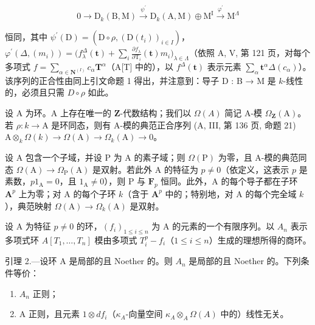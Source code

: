 \[
0 \to \mathrm{D} _ {k} (\mathrm{B}, \mathrm{M}) \xrightarrow {\psi^ {\prime}} \mathrm{D} _ {k} (\mathrm{A}, \mathrm{M}) \oplus \mathrm{M} ^ {\mathrm{I}} \xrightarrow {\varphi^ {\prime}} \mathrm{M} ^ {\Lambda}
\]

恒同，其中 \(\psi^{\prime}(\mathrm{D}) = (\mathrm{D}\circ \rho,(\mathrm{D}(t_{i}))_{i\in I})\)，\(\varphi^{\prime}(\Delta,(m_{i})) = \big(f_{\lambda}^{\Delta}(\mathbf{t}) + \sum_{i}\frac{\partial f_{\lambda}}{\partial\mathrm{T}_{i}}(\mathbf{t})m_{i}\big)_{\lambda \in \Lambda}\)（依照 A, V, 第 121 页，对每个多项式 \(f = \sum_{\alpha \in \mathbf{N}^{(I)}}c_{\alpha}\mathbf{T}^{\alpha}\)（A{[}T{]} 中的），以 \(f^{\Delta}(\mathbf{t})\) 表示元素 \(\sum_{\alpha}\mathbf{t}^{\alpha}\Delta(c_{\alpha})\)）。该序列的正合性由同上引文命题 1 得出，并注意到：导子 D : B → M 是 \(k\)-线性的，必须且只需 \(D\circ\rho\) 如此。

设 A 为环。A 上存在唯一的 \(\mathbf{Z}\)-代数结构；我们以 \(\Omega(A)\) 简记 A-模 \(\Omega_{\mathbf{Z}}(\mathrm{A})\)。若 \(\rho : k \to \mathrm{A}\) 是环同态，则有 A-模的典范正合序列 (A, III, 第 136 页, 命题 21) \(\mathrm{A} \otimes_k \Omega(k) \to \Omega(\mathrm{A}) \to \Omega_k(\mathrm{A}) \to 0\)。

设 A 包含一个子域，并设 P 为 A 的素子域；则 \(\Omega(\mathrm{P})\) 为零，且 A-模的典范同态 \(\Omega(\mathrm{A}) \to \Omega_{\mathrm{P}}(\mathrm{A})\) 是双射。若此外 A 的特征为 \(p \neq 0\)（依定义，这表示 \(p\) 是素数，\(p1_{\mathrm{A}} = 0\)，且 \(1_{\mathrm{A}} \neq 0\)），则 P 与 \(\mathbf{F}_p\) 恒同。此外，A 的每个导子都在子环 \(\mathbf{A}^p\) 上为零；对 A 的每个子环 \(k\)（含于 \(\mathbf{A}^p\) 中的；特别地，对 A 的每个完全域 \(k\)），典范映射 \(\Omega(\mathrm{A}) \to \Omega_k(\mathrm{A})\) 是双射。

设 A 为特征 \(p \neq 0\) 的环，\((f_i)_{1 \leqslant i \leqslant n}\) 为 A 的元素的一个有限序列。以 \(A_n\) 表示多项式环 \(A[T_1, \ldots, T_n]\) 模由多项式 \(T_i^p - f_i\)（\(1 \leqslant i \leqslant n\)）生成的理想所得的商环。

引理 2.—设环 A 是局部的且 Noether 的。则 \(A_{n}\) 是局部的且 Noether 的。下列条件等价：

\begin{enumerate}
\def\labelenumi{(\roman{enumi})}
\item
  \(A_{n}\) 正则；
\item
  A 正则，且元素 \(1 \otimes df_{i}\)（\(\kappa_{A}\)-向量空间 \(\kappa_{A} \otimes_{A} \Omega(A)\) 中的）线性无关。
\end{enumerate}

